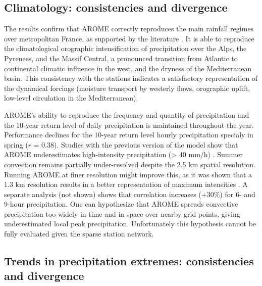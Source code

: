 \documentclass[hess, manuscript]{copernicus}
\begin{document}
\subsection{Climatology: consistencies and divergence}\label{climatology-consistencies-divergence-and-limitations}

The results confirm that AROME correctly reproduces the main rainfall
regimes over metropolitan France, as supported by the literature \citep{Fumiere2020,Caillaud2021,hess-28-2579-2024,LucasPicher2024,Cortes-Hernandez2024}. It is able to reproduce the climatological orographic intensification of precipitation over the Alps,
the Pyrenees, and the Massif Central, a pronounced transition from Atlantic to continental climatic influence in the west, and the dryness of the Mediterranean
basin. This consistency with the stations indicates a satisfactory
representation of the dynamical forcings (moisture transport by westerly
flows, orographic uplift, low-level circulation in the Mediterranean).

AROME's ability to reproduce the frequency and quantity of precipitation and the 10-year return level of daily precipitation
is maintained throughout the year. Performance declines for the
10-year return level hourly precipitation specialy in spring ($r$ = 0.38).
Studies with the previous version of the model show that AROME underestimates high-intensity precipitation (\textgreater{} 40
mm/h) \citep{Caillaud2021,poncet2024convection}. Summer
convection remains partially under-resolved despite the 2.5 km spatial
resolution. Running AROME at finer resolution might improve this, as it was shown that a 1.3 km resolution results in a better representation of maximum intensities \citep{brousseau-etal-2016}. A separate analysis (not shown) shows that
correlation increases (+30\%) for 6- and 9-hour precipitation.
One can hypothesize that AROME spreads convective precipitation too widely in time and in space over nearby grid points, giving underestimated local peak precipitation. Unfortunately this hypothesis cannot be fully evaluated given the sparse station network. 


\subsection{Trends in precipitation extremes: consistencies and
divergence}\label{trends-in-precipitation-extremes-consistencies-divergences-and-limitations}
\end{document}
